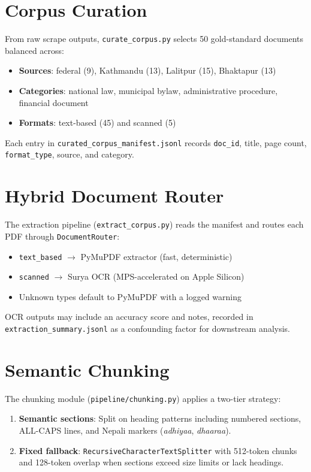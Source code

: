 \section{Corpus Curation}
From raw scrape outputs, \texttt{curate\_corpus.py} selects 50 gold-standard documents balanced across:
\begin{itemize}[leftmargin=*]
  \item \textbf{Sources}: federal (9), Kathmandu (13), Lalitpur (15), Bhaktapur (13)
  \item \textbf{Categories}: national law, municipal bylaw, administrative procedure, financial document
  \item \textbf{Formats}: text-based (45) and scanned (5)
\end{itemize}
Each entry in \texttt{curated\_corpus\_manifest.jsonl} records \texttt{doc\_id}, title, page count, \texttt{format\_type}, source, and category.

\section{Hybrid Document Router}
The extraction pipeline (\texttt{extract\_corpus.py}) reads the manifest and routes each PDF through \texttt{DocumentRouter}:
\begin{itemize}[leftmargin=*]
  \item \texttt{text\_based} $\rightarrow$ PyMuPDF extractor (fast, deterministic)
  \item \texttt{scanned} $\rightarrow$ Surya OCR (MPS-accelerated on Apple Silicon)
  \item Unknown types default to PyMuPDF with a logged warning
\end{itemize}

OCR outputs may include an accuracy score and notes, recorded in \texttt{extraction\_summary.jsonl} as a confounding factor for downstream analysis.

\section{Semantic Chunking}
The chunking module (\texttt{pipeline/chunking.py}) applies a two-tier strategy:
\begin{enumerate}[leftmargin=*]
  \item \textbf{Semantic sections}: Split on heading patterns including numbered sections, ALL-CAPS lines, and Nepali markers (\emph{adhiyaa}, \emph{dhaaraa}).
  \item \textbf{Fixed fallback}: \texttt{RecursiveCharacterTextSplitter} with 512-token chunks and 128-token overlap when sections exceed size limits or lack headings.
\end{enumerate}

